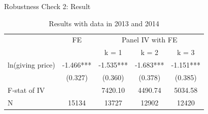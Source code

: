 \documentclass[
  ignorenonframetext,
]{beamer}
\begin{document}
\begin{frame}{Robustness Check 2: Result}
\protect\hypertarget{robustness-check-2-result}{}
\begin{table}

\caption{\label{tab:kableShortEstimateElasticity}Results with data in 2013 and 2014}
\centering
\fontsize{9}{11}\selectfont
\begin{tabular}[t]{lcccc}
\toprule
\multicolumn{1}{c}{ } & \multicolumn{1}{c}{FE} & \multicolumn{3}{c}{Panel IV with FE} \\
\cmidrule(l{3pt}r{3pt}){2-2} \cmidrule(l{3pt}r{3pt}){3-5}
 &  & k = 1 & k = 2 & k = 3\\
\midrule
ln(giving price) & -1.466*** & -1.535*** & -1.683*** & -1.151***\\
 & (0.327) & (0.360) & (0.378) & (0.385)\\
F-stat of IV &  & 7420.10 & 4490.74 & 5034.58\\
N & 15134 & 13727 & 12902 & 12420\\
\bottomrule
\end{tabular}
\end{table}
\end{frame}
\end{document}
